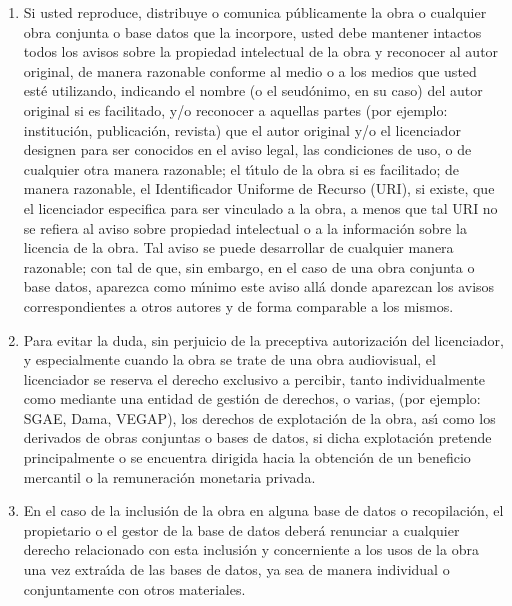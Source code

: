 \begin{enumerate}
\begin{enumerate}
  \item Si usted reproduce, distribuye o comunica p\'ublicamente la
    obra o cualquier obra conjunta o base datos que la incorpore,
    usted debe mantener intactos todos los avisos sobre la propiedad
    intelectual de la obra y reconocer al autor original, de manera
    razonable conforme al medio o a los medios que usted est\'e
    utilizando, indicando el nombre (o el seud\'onimo, en su caso) del
    autor original si es facilitado, y/o reconocer a aquellas partes
    (por ejemplo: instituci\'on, publicaci\'on, revista) que el autor
    original y/o el licenciador designen para ser conocidos en el
    aviso legal, las condiciones de uso, o de cualquier otra manera
    razonable; el t\'\i{}tulo de la obra si es facilitado; de manera
    razonable, el Identificador Uniforme de Recurso (URI), si existe,
    que el licenciador especifica para ser vinculado a la obra, a
    menos que tal URI no se refiera al aviso sobre propiedad
    intelectual o a la informaci\'on sobre la licencia de la obra. Tal
    aviso se puede desarrollar de cualquier manera razonable; con tal
    de que, sin embargo, en el caso de una obra conjunta o base datos,
    aparezca como m\'\i{}nimo este aviso all\'a donde aparezcan los
    avisos correspondientes a otros autores y de forma comparable a
    los mismos.

  \item Para evitar la duda, sin perjuicio de la preceptiva
    autorizaci\'on del licenciador, y especialmente cuando la obra se
    trate de una obra audiovisual, el licenciador se reserva el
    derecho exclusivo a percibir, tanto individualmente como mediante
    una entidad de gesti\'on de derechos, o varias, (por ejemplo:
    SGAE, Dama, VEGAP), los derechos de explotaci\'on de la obra,
    as\'\i{} como los derivados de obras conjuntas o bases de datos,
    si dicha explotaci\'on pretende principalmente o se encuentra
    dirigida hacia la obtenci\'on de un beneficio mercantil o la
    remuneraci\'on monetaria privada.

  \item En el caso de la inclusi\'on de la obra en alguna base de
    datos o recopilaci\'on, el propietario o el gestor de la base de
    datos deber\'a renunciar a cualquier derecho relacionado con esta
    inclusi\'on y concerniente a los usos de la obra una vez
    extra\'\i{}da de las bases de datos, ya sea de manera individual o
    conjuntamente con otros materiales.

  \end{enumerate}


\end{enumerate}
